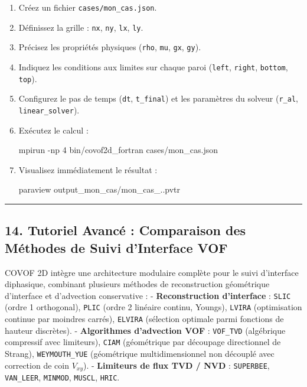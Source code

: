 \documentclass[
  french,
]{article}
\newenvironment{Shaded}{}{}
\newcommand{\AttributeTok}[1]{\textcolor[rgb]{0.49,0.56,0.16}{#1}}
\newcommand{\ExtensionTok}[1]{#1}
\newcommand{\NormalTok}[1]{#1}
\begin{document}
\begin{enumerate}
\def\labelenumi{\arabic{enumi}.}
\item
  Créez un fichier \texttt{cases/mon\_cas.json}.
\item
  Définissez la grille : \texttt{nx}, \texttt{ny}, \texttt{lx},
  \texttt{ly}.
\item
  Précisez les propriétés physiques (\texttt{rho}, \texttt{mu},
  \texttt{gx}, \texttt{gy}).
\item
  Indiquez les conditions aux limites sur chaque paroi (\texttt{left},
  \texttt{right}, \texttt{bottom}, \texttt{top}).
\item
  Configurez le pas de temps (\texttt{dt}, \texttt{t\_final}) et les
  paramètres du solveur (\texttt{r\_al}, \texttt{linear\_solver}).
\item
  Exécutez le calcul :

\begin{Shaded}
\begin{Highlighting}[]
\ExtensionTok{mpirun} \AttributeTok{{-}np}\NormalTok{ 4 bin/covof2d\_fortran cases/mon\_cas.json}
\end{Highlighting}
\end{Shaded}
\item
  Visualisez immédiatement le résultat :

\begin{Shaded}
\begin{Highlighting}[]
\ExtensionTok{paraview}\NormalTok{ output\_mon\_cas/mon\_cas\_..pvtr}
\end{Highlighting}
\end{Shaded}
\end{enumerate}

\begin{center}\rule{0.5\linewidth}{0.5pt}\end{center}

\subsection{14. Tutoriel Avancé : Comparaison des Méthodes de Suivi
d'Interface
VOF}\label{tutoriel-avancuxe9-comparaison-des-muxe9thodes-de-suivi-dinterface-vof}

COVOF 2D intègre une architecture modulaire complète pour le suivi
d'interface diphasique, combinant plusieurs méthodes de reconstruction
géométrique d'interface et d'advection conservative : -
\textbf{Reconstruction d'interface} : \texttt{SLIC} (ordre 1
orthogonal), \texttt{PLIC} (ordre 2 linéaire continu, Youngs),
\texttt{LVIRA} (optimisation continue par moindres carrés),
\texttt{ELVIRA} (sélection optimale parmi fonctions de hauteur
discrètes). - \textbf{Algorithmes d'advection VOF} : \texttt{VOF\_TVD}
(algébrique compressif avec limiteurs), \texttt{CIAM} (géométrique par
découpage directionnel de Strang), \texttt{WEYMOUTH\_YUE} (géométrique
multidimensionnel non découplé avec correction de coin \(V_{xy}\)). -
\textbf{Limiteurs de flux TVD / NVD} : \texttt{SUPERBEE},
\texttt{VAN\_LEER}, \texttt{MINMOD}, \texttt{MUSCL}, \texttt{HRIC}.
\end{document}
